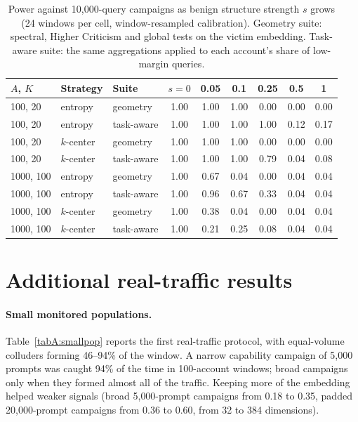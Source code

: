 \begin{table}[h]
\centering
\caption{Power against 10{,}000-query campaigns as benign structure strength $s$ grows (24 windows per cell, window-resampled calibration). Geometry suite: spectral, Higher Criticism and global tests on the victim embedding. Task-aware suite: the same aggregations applied to each account's share of low-margin queries.}
\label{tabA:dose}
\small
\begin{tabular}{lllcccccc}
\toprule
$A$, $K$ & Strategy & Suite & $s=0$ & 0.05 & 0.1 & 0.25 & 0.5 & 1 \\
\midrule
100, 20 & entropy & geometry & 1.00 & 1.00 & 1.00 & 0.00 & 0.00 & 0.00 \\
100, 20 & entropy & task-aware & 1.00 & 1.00 & 1.00 & 1.00 & 0.12 & 0.17 \\
100, 20 & $k$-center & geometry & 1.00 & 1.00 & 1.00 & 0.00 & 0.00 & 0.00 \\
100, 20 & $k$-center & task-aware & 1.00 & 1.00 & 1.00 & 0.79 & 0.04 & 0.08 \\
1000, 100 & entropy & geometry & 1.00 & 0.67 & 0.04 & 0.00 & 0.04 & 0.04 \\
1000, 100 & entropy & task-aware & 1.00 & 0.96 & 0.67 & 0.33 & 0.04 & 0.04 \\
1000, 100 & $k$-center & geometry & 1.00 & 0.38 & 0.04 & 0.00 & 0.04 & 0.04 \\
1000, 100 & $k$-center & task-aware & 1.00 & 0.21 & 0.25 & 0.08 & 0.04 & 0.04 \\
\bottomrule
\end{tabular}
\end{table}

\section{Additional real-traffic results}
\label{app:extra}

\paragraph{Small monitored populations.} Table~\ref{tabA:smallpop} reports the first real-traffic protocol, with equal-volume colluders forming 46--94\% of the window. A narrow capability campaign of 5{,}000 prompts was caught 94\% of the time in 100-account windows; broad campaigns only when they formed almost all of the traffic. Keeping more of the embedding helped weaker signals (broad 5{,}000-prompt campaigns from 0.18 to 0.35, padded 20{,}000-prompt campaigns from 0.36 to 0.60, from 32 to 384 dimensions).


